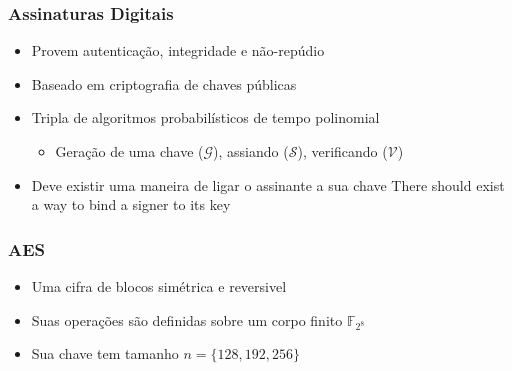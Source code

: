 \documentclass[12pt]{beamer}
\newcommand{\concat}{\, \vert \vert \,}
\newcommand{\hash}[2][]{\mathcal{H}^{#1}(#2)}
\begin{document}
\begin{frame}
  \frametitle{Assinaturas Digitais}
  \begin{itemize}
    \item Provem autenticação, integridade e não-repúdio
    \item Baseado em criptografia de chaves públicas
    \item Tripla de algoritmos probabilísticos de tempo polinomial
    
      \cite{Goldreich2004}
    \begin{itemize}
      \item Geração de uma chave ($\mathcal{G}$), assiando ($\mathcal{S}$),
          verificando ($\mathcal{V}$)
    \end{itemize}
    \item Deve existir uma maneira de ligar o assinante a sua chave
    There should exist a way to bind a signer to its key
  \end{itemize}

  \begin{figure}
  \end{figure}
\end{frame}

\begin{frame}
    \frametitle{AES}
    \begin{itemize}
        \item Uma cifra de blocos simétrica e reversivel
        \item Suas operações são definidas sobre um corpo finito
        $\mathbb{F}_{2^{8}}$
        \item Sua chave tem tamanho $n = \{128,192,256 \}$
    \end{itemize}
    
\end{frame}
\end{document}
